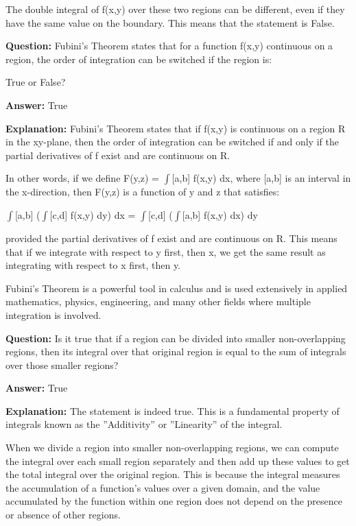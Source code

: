 \documentclass{article}
\begin{document}
The double integral of f(x,y) over these two regions can be different, even if they have the same value on the boundary. This means that the statement is False.
                
                \vspace{0.5cm} 
        
            
                \textbf {Question:} Fubini's Theorem states that for a function f(x,y) continuous on a region, the order of integration can be switched if the region is: 

True or False?
                
                \textbf{Answer:} True

                \textbf{Explanation:} Fubini's Theorem states that if f(x,y) is continuous on a region R in the xy-plane, then the order of integration can be switched if and only if the partial derivatives of f exist and are continuous on R.

In other words, if we define F(y,z) = \ensuremath{\int}[a,b] f(x,y) dx, where [a,b] is an interval in the x-direction, then F(y,z) is a function of y and z that satisfies:

\ensuremath{\int}[a,b] (\ensuremath{\int}[c,d] f(x,y) dy) dx = \ensuremath{\int}[c,d] (\ensuremath{\int}[a,b] f(x,y) dx) dy

provided the partial derivatives of f exist and are continuous on R. This means that if we integrate with respect to y first, then x, we get the same result as integrating with respect to x first, then y.

Fubini's Theorem is a powerful tool in calculus and is used extensively in applied mathematics, physics, engineering, and many other fields where multiple integration is involved.
                
                \vspace{0.5cm} 
        
            
                \textbf {Question:} Is it true that if a region can be divided into smaller non-overlapping regions, then its integral over that original region is equal to the sum of integrals over those smaller regions?
                
                \textbf{Answer:} True

                \textbf{Explanation:} The statement is indeed true. This is a fundamental property of integrals known as the ''Additivity'' or ''Linearity'' of the integral.

When we divide a region into smaller non-overlapping regions, we can compute the integral over each small region separately and then add up these values to get the total integral over the original region. This is because the integral measures the accumulation of a function's values over a given domain, and the value accumulated by the function within one region does not depend on the presence or absence of other regions.
\end{document}
